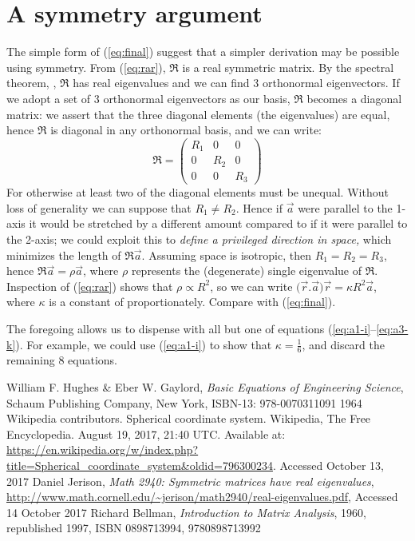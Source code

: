 \documentclass[]{article}
\begin{document}
\section{A symmetry argument}\label{sect:symmetry}
The simple form of (\ref{eq:final}) suggest that a simpler derivation may be possible using symmetry. From (\ref{eq:rar}), $\mathfrak{R}$ is a real symmetric matrix. By the spectral theorem, \cite{spectral-theorem} \cite{bellman1970}, $\mathfrak{R}$ has real eigenvalues and we can find 3 orthonormal eigenvectors. If we adopt a set of 3 orthonormal eigenvectors as our basis, $\mathfrak{R}$ becomes a diagonal matrix: we assert that the three diagonal elements (the eigenvalues) are equal, hence $\mathfrak{R}$ is diagonal in any orthonormal basis, and we can write:
\[\mathfrak{R}= 
\begin{pmatrix}
R_1 & 0 & 0 \\
0 & R_2 & 0 \\
0 & 0 & R_3
\end{pmatrix}
\]
For otherwise at least two of the diagonal elements must be unequal. Without loss of generality we can suppose that $R_1 \neq R_2$. Hence if $\vec{a}$ were parallel to the 1-axis it would be stretched by a different amount compared to if it were parallel to the 2-axis; we could exploit this to \emph{define a privileged direction in space,} which minimizes the length of $\mathfrak{R}\vec{a}$. Assuming space is isotropic, then $R_1=R_2=R_3$, hence $\mathfrak{R}\vec{a}=\rho\vec{a}$, where $\rho$ represents the (degenerate) single eigenvalue of $\mathfrak{R}$. Inspection of (\ref{eq:rar}) shows that $\rho \propto R^2$, so we can write $\big(\vec{r}.\vec{a}\big)\vec{r}=\kappa R^2 \vec{a}$, where $\kappa$ is a constant of proportionately. Compare with (\ref{eq:final}).

The foregoing allows us to dispense with all but one of equations (\ref{eq:a1-i}--\ref{eq:a3-k}). For example, we could use (\ref{eq:a1-i}) to show that $\kappa=\frac{1}{6}$, and discard the remaining 8 equations.

\begin{thebibliography}{9}
	\raggedright
	William F. Hughes \& Eber W. Gaylord,
	\emph{Basic Equations of Engineering Science},
	Schaum Publishing Company, New York,
	ISBN-13: 978-0070311091
	1964
	Wikipedia contributors. Spherical coordinate system. Wikipedia, The Free Encyclopedia. August 19, 2017, 21:40 UTC. Available at: 
	\url{https://en.wikipedia.org/w/index.php?title=Spherical_coordinate_system&oldid=796300234}.
	Accessed
	October 13, 2017
	Daniel Jerison,
	\emph{Math 2940: Symmetric matrices have real eigenvalues},
	\url{http://www.math.cornell.edu/~jerison/math2940/real-eigenvalues.pdf},
	Accessed 14 October 2017
	Richard Bellman,
	\emph{Introduction to Matrix Analysis},
	1960, republished 1997,
	ISBN	0898713994, 9780898713992
\end{thebibliography}
\end{document}
